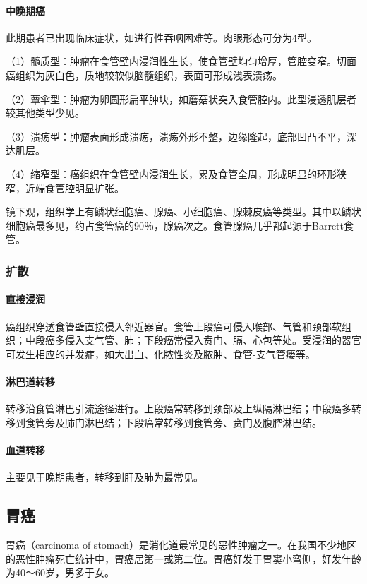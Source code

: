 \paragraph{中晚期癌}
此期患者已出现临床症状，如进行性吞咽困难等。肉眼形态可分为4型。

（1）髓质型：肿瘤在食管壁内浸润性生长，使食管壁均匀增厚，管腔变窄。切面癌组织为灰白色，质地较软似脑髓组织，表面可形成浅表溃疡。

（2）蕈伞型：肿瘤为卵圆形扁平肿块，如蘑菇状突入食管腔内。此型浸透肌层者较其他类型少见。

（3）溃疡型：肿瘤表面形成溃疡，溃疡外形不整，边缘隆起，底部凹凸不平，深达肌层。

（4）缩窄型：癌组织在食管壁内浸润生长，累及食管全周，形成明显的环形狭窄，近端食管腔明显扩张。

镜下观，组织学上有鳞状细胞癌、腺癌、小细胞癌、腺棘皮癌等类型。其中以鳞状细胞癌最多见，约占食管癌的90％，腺癌次之。食管腺癌几乎都起源于Barrett食管。

\subsubsection{扩散}

\paragraph{直接浸润}
癌组织穿透食管壁直接侵入邻近器官。食管上段癌可侵入喉部、气管和颈部软组织；中段癌多侵入支气管、肺；下段癌常侵入贲门、膈、心包等处。受浸润的器官可发生相应的并发症，如大出血、化脓性炎及脓肿、食管-支气管瘘等。

\paragraph{淋巴道转移}
转移沿食管淋巴引流途径进行。上段癌常转移到颈部及上纵隔淋巴结；中段癌多转移到食管旁及肺门淋巴结；下段癌常转移到食管旁、贲门及腹腔淋巴结。

\paragraph{血道转移}
主要见于晚期患者，转移到肝及肺为最常见。

\subsection{胃癌}

胃癌（carcinoma of
stomach）是消化道最常见的恶性肿瘤之一。在我国不少地区的恶性肿瘤死亡统计中，胃癌居第一或第二位。胃癌好发于胃窦小弯侧，好发年龄为40～60岁，男多于女。

